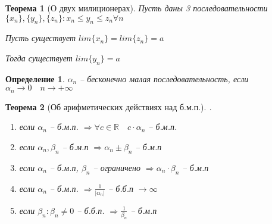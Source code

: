 \documentclass{book}
\newtheorem{Def}{Определение}[chapter]
\newtheorem{Th}{Теорема}[chapter]
\begin{document}
\begin{Th}[О двух милиционерах]
Пусть  даны 3 последовательности $\{x_n\}, \{y_n\}, \{z_n\} : x_n\leqslant y_n \leqslant z_n \forall n$

Пусть существует $lim \{x_n\} = lim \{z_n\} = a$

Тогда существует $lim\{y_n\} = a$

\end{Th}

\begin{Def}
	$\alpha_n$ -- бесконечно малая последовательность, если $\alpha_n \to 0\quad n\to +\infty$
\end{Def}

\begin{Th}[Об арифметических действиях над б.м.п.]
.\\
	\begin{enumerate}
		\item если $\alpha_n$ -- б.м.п. $\Rightarrow \forall c \in \mathds{R}\quad c\cdot\alpha_n$ -- б.м.п.
		\item если $\alpha_n, \beta_n$ -- б.м.п $\Rightarrow \alpha_n \pm\beta_n$ -- б.м.п
		\item если $\alpha_n$ -- б.м.п, $\beta_n$ -- ограничено $\Rightarrow \alpha_n\cdot\beta_n$ -- б.м.п
		\item если $\alpha_n $ -- б.м.п. $\Rightarrow \frac{1}{|\alpha_n|}$ -- б.б.п $\to \infty$
		\item если $\beta_n: \beta_n \neq 0$ -- б.б.п. $\Rightarrow \frac{1}{\beta_n}$ -- б.м.п
	\end{enumerate} 
\end{Th}
\end{document}
